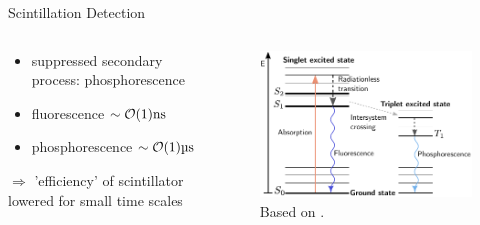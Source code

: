\documentclass[aspectratio=169]{beamer}
\begin{document}
\begin{frame}{Scintillation Detection}
	
	\begin{columns}
		\begin{column}{0.5\textwidth}
			\begin{itemize}
				\item suppressed secondary process: phosphorescence
				\item fluorescence $\sim \order{1}\SI{}{\nano\second}$
				\item phosphorescence $\sim \order{1}\SI{}{\micro\second}$ \\
				
			\end{itemize}
			$\Rightarrow$ 'efficiency' of scintillator lowered for small time scales
		\end{column}
		
		\begin{column}{0.5\textwidth}
			\begin{figure}
				\centering
				\includegraphics[width=\textwidth]{pictures/jablonski.pdf}
				\caption{Based on \cite{SCINTILLATION-TORRES}.}
			\end{figure}
		\end{column}
	\end{columns}
	
\end{frame}
\end{document}
